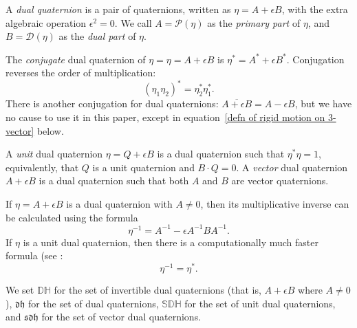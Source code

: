 \documentclass[reqno,12pt]{amsart}
\newcommand\setinvertibledualquat{\mathbb D\mathbb H}
\newcommand\setdualquat{\mathfrak d \mathfrak h}
\newcommand\setunitdualquat{\mathbb S\mathbb D\mathbb H}
\newcommand\setvectordualquat{\mathfrak{s}\mathfrak d \mathfrak h}
\begin{document}
A \emph{dual quaternion} is a pair of quaternions, written as $\eta = A + \epsilon B$, with the extra algebraic operation $\epsilon^2 = 0$.  We call $A = \mathcal P(\eta)$ as the \emph{primary part} of $\eta$, and $B = \mathcal D(\eta)$ as the \emph{dual part} of $\eta$.

The \emph{conjugate} dual quaternion of $\eta = \eta = A + \epsilon B$ is $\eta^* = A^* + \epsilon B^*$.  Conjugation reverses the order of multiplication:
\begin{equation}
(\eta_1\eta_2)^* = \eta_2^* \eta_1^* .
\end{equation}
There is another conjugation for dual quaternions: $\overline{A + \epsilon B} = A - \epsilon B$, but we have no cause to use it in this paper, except in equation~\eqref{defn of rigid motion on 3-vector} below.

A \emph{unit} dual quaternion $\eta = Q + \epsilon B$ is a dual quaternion such that $\eta^*\eta = 1$, equivalently, that $Q$ is a unit quaternion and $B \cdot Q = 0$.  A \emph{vector} dual quaternion $A + \epsilon B$ is a dual quaternion such that both $A$ and $B$ are vector quaternions.

If $\eta = A + \epsilon B$ is a dual quaternion with $A \ne 0$, then its multiplicative inverse can be calculated using the formula
\begin{equation}
\eta^{-1} = A^{-1} - \epsilon A^{-1} B A^{-1}.
\end{equation}
If $\eta$ is a unit dual quaternion, then there is a computationally much faster formula (see \cite{adorno}:
\begin{equation}
\label{inverse unit}
\eta^{-1} = \eta^*.
\end{equation}

We set $\setinvertibledualquat$ for the set of invertible dual quaternions (that is, $A +\epsilon B$ where $A \ne 0$), $\setdualquat$ for the set of dual quaternions, $\setunitdualquat$ for the set of unit dual quaternions, and $\setvectordualquat$ for the set of vector dual quaternions.
\end{document}
